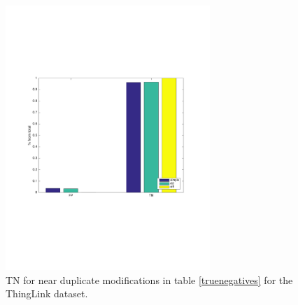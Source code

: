 \documentclass[english,12pt,a4paper,pdftex,elec,utf8]{aaltothesis}
\begin{document}
\begin{figure}[htb]
\begin{center}
\includegraphics[height=10cm]{figures/thinglink_tnBar}
\end{center}
\caption{ TN for near duplicate modifications in table \ref{truenegatives} for the ThingLink dataset.}
\label{thinglinktntotal}
\end{figure}
\end{document}
